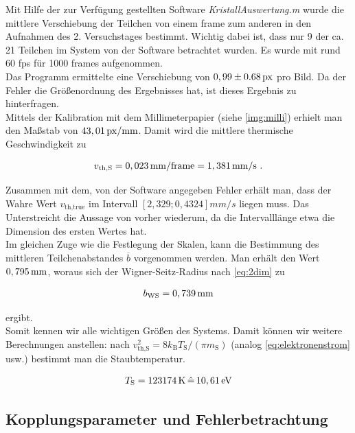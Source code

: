 \documentclass[numbers=noenddot,a4paper,notitlepage,twoside,BCOR15mm]{scrartcl}
\newcommand{\ix}[1]{_\text{#1}}
\newcommand{\tilt}[1]{\textit{#1}}
\begin{document}
		Mit Hilfe der zur Verfügung gestellten Software \tilt{KristallAuswertung.m} wurde die mittlere Verschiebung der Teilchen von einem frame zum anderen in den Aufnahmen des 2. Versuchstages bestimmt. Wichtig dabei ist, dass nur 9 der ca. 21 Teilchen im System von der Software betrachtet wurden. Es wurde mit rund 60 fps für 1000 frames aufgenommen. \\
		Das Programm ermittelte eine Verschiebung von $\unit[0,99\pm 0.68]{px}$ pro Bild. Da der Fehler die Größenordnung des Ergebnisses hat, ist dieses Ergebnis zu hinterfragen.\\
		Mittels der Kalibration mit dem Millimeterpapier (siehe \autoref{img:milli}) erhielt man den Maßstab von $\unit[43,01]{px/mm}$. Damit wird die mittlere thermische Geschwindigkeit zu

			\begin{align}
				v\ix{th,S}=\unit[0,023]{mm/frame}=\unit[1,381]{mm/s} \,\, .\label{eq:geschw}
			\end{align}

		Zusammen mit dem, von der Software angegeben Fehler erhält man, dass der Wahre Wert $v\ix{th,true}$ im Intervall $\left[2,329; 0,4324\right]\unit{mm/s}$ liegen muss. Das Unterstreicht die Aussage von vorher wiederum, da die Intervalllänge etwa die Dimension des ersten Wertes hat.\\
		Im gleichen Zuge wie die Festlegung der Skalen, kann die Bestimmung des mittleren Teilchenabstandes $\overline{b}$ vorgenommen werden. Man erhält den Wert $\unit[0,795]{mm}$, woraus sich der Wigner-Seitz-Radius nach \autoref{eq:2dim} zu

			\begin{align}
				b\ix{WS}=\unit[0,739]{mm} \label{eq:wigner}
			\end{align}

		ergibt.\\
		Somit kennen wir alle wichtigen Größen des Systems. Damit können wir weitere Berechnungen anstellen: nach $v\ix{th,S}^2=8k\ix{B}T\ix{S}/(\pi m\ix{S})$ (analog \autoref{eq:elektronenstrom} usw.) bestimmt man die Staubtemperatur.

			\begin{align}
				T\ix{S}=\unit[123174]{K}\,\hat{=}\,\unit[10,61]{eV} \label{eq:temp}
			\end{align}

	\subsection{Kopplungsparameter und Fehlerbetrachtung}
\end{document}
